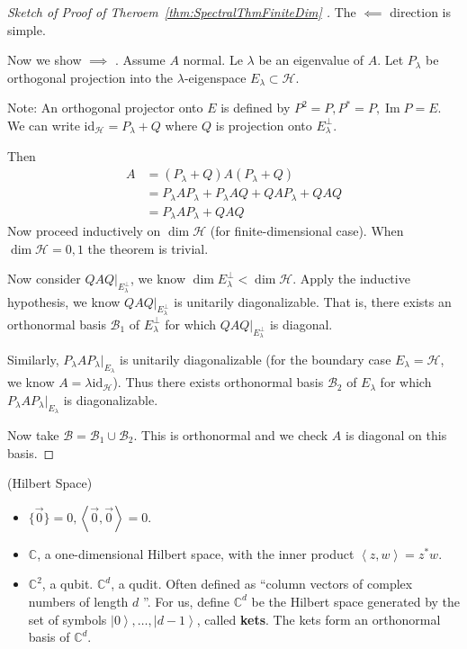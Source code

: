 
\begin{proof}[Sketch of Proof of Theroem~\ref{thm:SpectralThmFiniteDim} ]
	
	The $\impliedby$ direction is simple.

	Now we show $\implies$ .
	Assume $A$ normal. Le $\lambda$ be an eigenvalue of $A$. Let $P_\lambda$ be orthogonal projection into the $\lambda$-eigenspace $E_\lambda \subset \mathscr{H}$. 

	Note: An orthogonal projector onto $E$ is defined by $P^2 = P, P^* = P, \operatorname{Im} P = E$. We can write $\text{id}_{\mathscr{H}} = P_\lambda + Q $ where $Q$ is projection onto $E_\lambda^{\perp}$.

	Then
	\begin{align*}
		A &= (P_\lambda + Q) A (P _\lambda + Q)\\
		&= P_\lambda A P_\lambda + P_\lambda A Q + Q A P_\lambda + Q A Q \\
		&= P_\lambda A P_\lambda + Q A Q 
	\end{align*}
	Now proceed inductively on $ \operatorname{dim} \mathscr{H}$ (for finite-dimensional case).
	When $\operatorname{dim} \mathscr{H} = 0, 1$ the theorem is trivial. 

	Now consider $Q A Q | _{E_\lambda^\perp}$, we know $\operatorname{dim} E_\lambda^\perp < \operatorname{dim} \mathscr{H}$. Apply the inductive hypothesis, we know $Q A Q|_{E_\lambda^\perp}$ is unitarily diagonalizable.
	That is, there exists an orthonormal basis $\mathscr{B}_1$ of $E_\lambda^\perp$ for which $Q A Q|_{E _\lambda^\perp}$ is diagonal.

	Similarly, $P_\lambda A P_\lambda |_{E_\lambda}$ is unitarily diagonalizable (for the boundary case $E_\lambda = \mathscr{H}$, we know $A = \lambda \text{id}_{\mathscr{H}}$). Thus there exists orthonormal basis $\mathscr{B}_2$ of $E_\lambda$ for which $P_\lambda A P_\lambda |_{E_\lambda}$ is diagonalizable.

	Now take $\mathscr{B} = \mathscr{B}_1 \cup \mathscr{B}_2$. This is orthonormal and we check $A$ is diagonal on this basis. 
\end{proof}

\begin{example}(Hilbert Space)
	\begin{itemize}
		\item $\{ \vec{0} \} = 0 , \left\langle \vec{0} , \vec{0}  \right\rangle = 0$.
		\item $\mathbb{C}$, a one-dimensional Hilbert space, with the inner product $\left\langle z, w \right\rangle  = z^* w$.
		\item $\mathbb{C}^2$, a qubit. $\mathbb{C}^d$, a qudit. 
			Often defined as ``column vectors of complex numbers of length $d$ ''. For us, define $\mathbb{C}^d$ be the Hilbert space generated by the set of symbols $\left| 0 \right\rangle , \ldots, \left| d - 1 \right\rangle $, called \textbf{kets}. The kets form an orthonormal basis of $\mathbb{C}^d$.
	\end{itemize}
\end{example}

